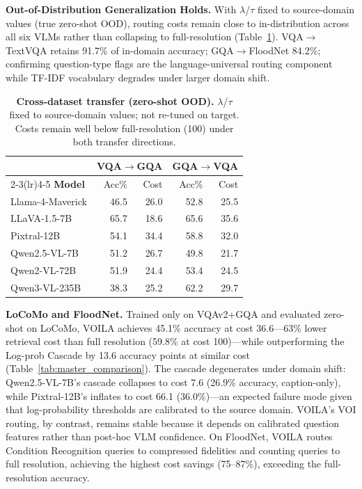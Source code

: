 \textbf{Out-of-Distribution Generalization Holds.}
With $\lambda$/$\tau$ fixed to source-domain values (true zero-shot OOD), routing costs remain close to in-distribution across all six VLMs rather than collapsing to full-resolution (Table~\ref{tab:ood_pixtral_compact}).
VQA$\to$TextVQA retains 91.7\% of in-domain accuracy; GQA$\to$FloodNet 84.2\%; confirming question-type flags are the language-universal routing component while TF-IDF vocabulary degrades under larger domain shift.

\begin{table}[htb]
\centering
\small
\setlength{\tabcolsep}{4pt}
\renewcommand{\arraystretch}{0.95}
\caption{\textbf{Cross-dataset transfer (zero-shot OOD).} $\lambda$/$\tau$ fixed to source-domain values; not re-tuned on target. Costs remain well below full-resolution (100) under both transfer directions.}
\label{tab:ood_pixtral_compact}
\begin{tabular}{lrrrr}
\toprule
& \multicolumn{2}{c}{\textbf{VQA$\to$GQA}} & \multicolumn{2}{c}{\textbf{GQA$\to$VQA}} \\
\cmidrule(lr){2-3}\cmidrule(lr){4-5}
\textbf{Model} & Acc\% & Cost & Acc\% & Cost \\
\midrule
Llama-4-Maverick & 46.5 & 26.0 & 52.8 & 25.5 \\
LLaVA-1.5-7B     & 65.7 & 18.6 & 65.6 & 35.6 \\
Pixtral-12B       & 54.1 & 34.4 & 58.8 & 32.0 \\
Qwen2.5-VL-7B    & 51.2 & 26.7 & 49.8 & 21.7 \\
Qwen2-VL-72B     & 51.9 & 24.4 & 53.4 & 24.5 \\
Qwen3-VL-235B    & 38.3 & 25.2 & 62.2 & 29.7 \\
\bottomrule
\end{tabular}
\end{table}

\textbf{LoCoMo and FloodNet.}
Trained only on VQAv2+GQA and evaluated zero-shot on LoCoMo, \textsc{VOILA} achieves 45.1\% accuracy at cost 36.6---63\% lower retrieval cost than full resolution (59.8\% at cost 100)---while outperforming the Log-prob Cascade by 13.6 accuracy points at similar cost (Table~\ref{tab:master_comparison}).
The cascade degenerates under domain shift: Qwen2.5-VL-7B's cascade collapses to cost 7.6 (26.9\% accuracy, caption-only), while Pixtral-12B's inflates to cost 66.1 (36.0\%)---an expected failure mode given that log-probability thresholds are calibrated to the source domain.
\textsc{VOILA}'s VOI routing, by contrast, remains stable because it depends on calibrated question features rather than post-hoc VLM confidence.
On FloodNet, \textsc{VOILA} routes Condition Recognition queries to compressed fidelities and counting queries to full resolution, achieving the highest cost savings (75--87\%), exceeding the full-resolution accuracy.


